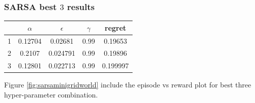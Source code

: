 \documentclass[11pt, a4]{article}
\begin{document}
			\subsubsection{SARSA best $3$ results}
				\begin{center}
					\begin{tabular}{|c|c|c|c|c|}
						\hline
						& $\alpha$ & $\epsilon$ &$\gamma$& regret\\
						\hline
						1 & 0.12704 & 0.02681 & 0.99 & 0.19653\\
						\hline
						2 & 0.2107 & 0.024791 & 0.99 & 0.19896\\
						\hline
						3 & 0.12801 & 0.022713 & 0.99 & 0.199997\\
						\hline
					\end{tabular}
				\end{center}
				Figure \ref{fig:sarsaminigridworld} include the episode vs reward plot for best three hyper-parameter combination.
\end{document}
